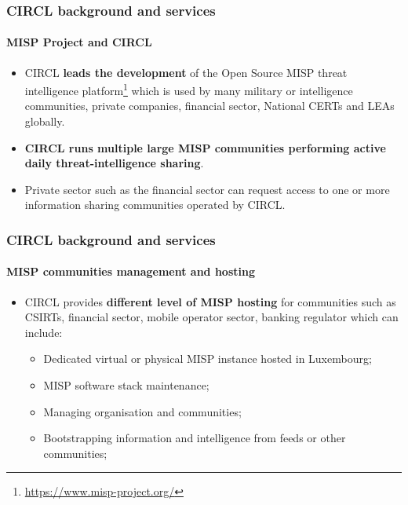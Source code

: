 \begin{frame}
	\frametitle{CIRCL background and services}
	\framesubtitle{MISP Project and CIRCL}
    \begin{itemize}
        \item CIRCL {\bf leads the development} of the Open Source MISP threat intelligence platform\footnote{\url{https://www.misp-project.org/}} which is used by many military or intelligence communities, private companies, financial sector, National CERTs and LEAs globally.  
        \item {\bf CIRCL runs multiple large MISP communities performing active daily threat-intelligence sharing}.
        \item Private sector such as the financial sector can request access to one or more information sharing communities operated by CIRCL.
    \end{itemize}
\end{frame}

\begin{frame}
	\frametitle{CIRCL background and services}
	\framesubtitle{MISP communities management and hosting}
    	\begin{itemize}
      	 	\item CIRCL provides {\bf different level of MISP hosting} for communities such as CSIRTs, financial sector, mobile operator sector, banking regulator which can include:
           	\begin{itemize}
            		\item Dedicated virtual or physical MISP instance hosted in Luxembourg; 
            		\item MISP software stack maintenance;
            		\item Managing organisation and communities;
            		\item Bootstrapping information and intelligence from feeds or other communities; 
            	\end{itemize}
    	\end{itemize}
\end{frame}

